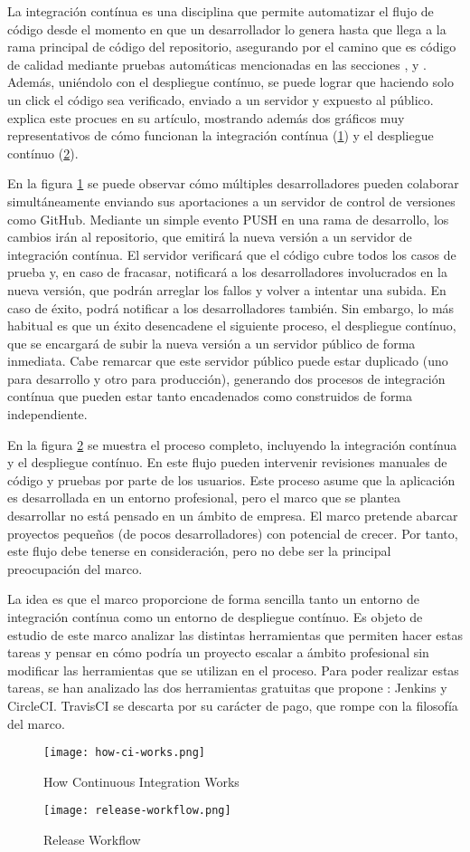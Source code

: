 La integración contínua es una disciplina que permite automatizar el flujo de código desde el momento en que un desarrollador lo genera hasta que llega a la rama principal de código del repositorio, asegurando por el camino que es código de calidad mediante pruebas automáticas mencionadas en las secciones ,  y . Además, uniéndolo con el despliegue contínuo, se puede lograr que haciendo solo un click el código sea verificado, enviado a un servidor y expuesto al público. \citet{CVTRVJK} explica este procues en su artículo, mostrando además dos gráficos muy representativos de cómo funcionan la integración contínua (\cref{fig:ci}) y el despliegue contínuo (\cref{fig:cd}).

En la figura \cref{fig:ci} se puede observar cómo múltiples desarrolladores pueden colaborar simultáneamente enviando sus aportaciones a un servidor de control de versiones como GitHub. Mediante un simple evento PUSH en una rama de desarrollo, los cambios irán al repositorio, que emitirá la nueva versión a un servidor de integración contínua. El servidor verificará que el código cubre todos los casos de prueba y, en caso de fracasar, notificará a los desarrolladores involucrados en la nueva versión, que podrán arreglar los fallos y volver a intentar una subida. En caso de éxito, podrá notificar a los desarrolladores también. Sin embargo, lo más habitual es que un éxito desencadene el siguiente proceso, el despliegue contínuo, que se encargará de subir la nueva versión a un servidor público de forma inmediata. Cabe remarcar que este servidor público puede estar duplicado (uno para desarrollo y otro para producción), generando dos procesos de integración contínua que pueden estar tanto encadenados como construidos de forma independiente.

En la figura \cref{fig:cd} se muestra el proceso completo, incluyendo la integración contínua y el despliegue contínuo. En este flujo pueden intervenir revisiones manuales de código y pruebas por parte de los usuarios. Este proceso asume que la aplicación es desarrollada en un entorno profesional, pero el marco que se plantea desarrollar no está pensado en un ámbito de empresa. El marco pretende abarcar proyectos pequeños (de pocos desarrolladores) con potencial de crecer. Por tanto, este flujo debe tenerse en consideración, pero no debe ser la principal preocupación del marco.

La idea es que el marco proporcione de forma sencilla tanto un entorno de integración contínua como un entorno de despliegue contínuo. Es objeto de estudio de este marco analizar las distintas herramientas que permiten hacer estas tareas y pensar en cómo podría un proyecto escalar a ámbito profesional sin modificar las herramientas que se utilizan en el proceso. Para poder realizar estas tareas, se han analizado las dos herramientas gratuitas que propone \citet{CVTRVJK}: Jenkins y CircleCI. TravisCI se descarta por su carácter de pago, que rompe con la filosofía del marco.

\begin{figure}
	\centering
	\texttt{[image: how-ci-works.png]}
	\caption{How Continuous Integration Works}
	\label{fig:ci}
\end{figure}

\begin{figure}
	\centering
	\texttt{[image: release-workflow.png]}
	\caption{Release Workflow}
	\label{fig:cd}
\end{figure}
